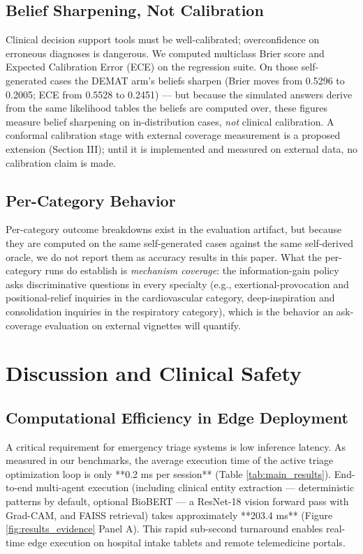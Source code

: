 \documentclass[10pt,twocolumn]{article}
\begin{document}
\subsection{Belief Sharpening, Not Calibration}
Clinical decision support tools must be well-calibrated; overconfidence on erroneous diagnoses is dangerous. We computed multiclass Brier score \cite{brier1950verification} and Expected Calibration Error (ECE) on the regression suite. On those self-generated cases the DEMAT arm's beliefs sharpen (Brier moves from 0.5296 to 0.2005; ECE from 0.5528 to 0.2451) --- but because the simulated answers derive from the same likelihood tables the beliefs are computed over, these figures measure belief sharpening on in-distribution cases, \emph{not} clinical calibration. A conformal calibration stage with external coverage measurement is a proposed extension (Section III); until it is implemented and measured on external data, no calibration claim is made.

\subsection{Per-Category Behavior}
Per-category outcome breakdowns exist in the evaluation artifact, but because they are computed on the same self-generated cases against the same self-derived oracle, we do not report them as accuracy results in this paper. What the per-category runs do establish is \emph{mechanism coverage}: the information-gain policy asks discriminative questions in every specialty (e.g., exertional-provocation and positional-relief inquiries in the cardiovascular category, deep-inspiration and consolidation inquiries in the respiratory category), which is the behavior an ask-coverage evaluation on external vignettes will quantify.

\section{Discussion and Clinical Safety}

\subsection{Computational Efficiency in Edge Deployment}
A critical requirement for emergency triage systems is low inference latency. As measured in our benchmarks, the average execution time of the active triage optimization loop is only **0.2 ms per session** (Table \ref{tab:main_results}). End-to-end multi-agent execution (including clinical entity extraction --- deterministic patterns by default, optional BioBERT --- a ResNet-18 vision forward pass with Grad-CAM, and FAISS retrieval) takes approximately **203.4 ms** (Figure \ref{fig:results_evidence} Panel A). This rapid sub-second turnaround enables real-time edge execution on hospital intake tablets and remote telemedicine portals.
\end{document}
